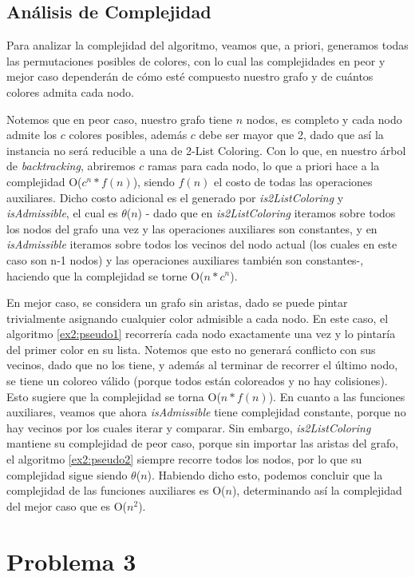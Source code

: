 \documentclass{article}
\theoremstyle{definition}
\theoremstyle{remark}
\begin{document}
\subsection{Análisis de Complejidad}
Para analizar la complejidad del algoritmo, veamos que, a priori, generamos todas las permutaciones posibles de colores, con lo cual las complejidades en peor y mejor caso dependerán de cómo esté compuesto nuestro grafo y de cuántos colores admita cada nodo.

Notemos que en peor caso, nuestro grafo tiene $n$ nodos, es completo y cada nodo admite los $c$ colores posibles, además $c$ debe ser mayor que 2, dado que así la instancia no será reducible a una de 2-List Coloring. Con lo que, en nuestro árbol de \textit{backtracking}, abriremos $c$ ramas para cada nodo, lo que a priori hace a la complejidad O($c^{n}*f(n)$), siendo $f(n)$ el costo de todas las operaciones auxiliares. Dicho costo adicional es el generado por \textit{is2ListColoring} y \textit{isAdmissible}, el cual es $\theta$($n$) - dado que en \textit{is2ListColoring} iteramos sobre todos los nodos del grafo una vez y las operaciones auxiliares son constantes, y en \textit{isAdmissible} iteramos sobre todos los vecinos del nodo actual (los cuales en este caso son n-1 nodos) y las operaciones auxiliares también son constantes-, haciendo que la complejidad se torne O($n*c^{n}$).

En mejor caso, se considera un grafo sin aristas, dado se puede pintar trivialmente asignando cualquier color admisible a cada nodo. En este caso, el algoritmo \ref{ex2:pseudo1} recorrería cada nodo exactamente una vez y lo pintaría del primer color en su lista. Notemos que esto no generará conflicto con sus vecinos, dado que no los tiene, y además al terminar de recorrer el último nodo, se tiene un coloreo válido (porque todos están coloreados y no hay colisiones). Esto sugiere que la complejidad se torna O($n*f(n)$).
En cuanto a las funciones auxiliares, veamos que ahora \textit{isAdmissible} tiene complejidad constante, porque no hay vecinos por los cuales iterar y comparar. Sin embargo, \textit{is2ListColoring} mantiene su complejidad de peor caso, porque sin importar las aristas del grafo, el algoritmo \ref{ex2:pseudo2} siempre recorre todos los nodos, por lo que su complejidad sigue siendo $\theta$($n$). Habiendo dicho esto, podemos concluir que la complejidad de las funciones auxiliares es O($n$), determinando así la complejidad del mejor caso que es O($n^{2}$).

\section{Problema 3}
\end{document}
